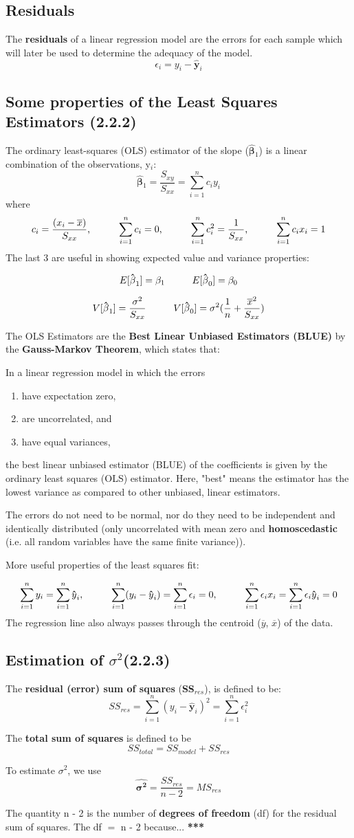 \documentclass{article}
\newcommand{\mt}[1]{\ensuremath{#1}}
\newcommand\ssc[2][\DefaultOpt]{%
  \def\DefaultOpt{#2}%
  \subsection[#1]{#2}%
}
\newcommand{\balist}{\begin{enumerate}[label=\alph*.]}
\newcommand{\elist}{\end{enumerate}}
\newcommand{\ep}{\mt{\epsilon} }         %
\newcommand{\bta}{\mt{\beta} }
\newcommand{\ms}{\mt{\operatorname{-}} }
\newcommand{\eql}{ \mt{\operatorname{=}} }
\newcommand{\uw}[2]{#1\mt{_{#2}}}
\newcommand{\eqn}[1]{\[#1\]}
\newcommand{\txt}[1]{\text{#1}} %
\newcommand{\mn}[1]{\mt{\overline{#1}}}
\newcommand{\ssq}{\mt{\sigma^2}}
\newcommand{\bh}[1]{\mathbf{\hat{\text{$#1$}}}}
\newcommand{\bth}{\mt{\bh{\beta}}}
\newcommand{\exv}[1]{E[#1]}
\newcommand{\vrn}[1]{V[#1]}
\newcommand\tab[1][1cm]{\hspace*{#1}}
\newcommand{\sumin}[1]{\mt{\sum_{i = 1}^n #1}}
\begin{document}
\ssc{Residuals}{

The \textbf{residuals} of a linear regression model are the errors for each sample which will later be used to determine the adequacy of the model.
\eqn{\uw{\ep}{i} = y_i - \bh{y}_i}

}
\ssc{Some properties of the Least Squares Estimators (2.2.2)}{

The ordinary least-squares (OLS) estimator of the
slope (\uw{\bth}{1}) is a linear combination of the observations,
\uw{y}{i}:
\eqn{\uw{\bth}{1} = \frac{\uw{S}{xy}}{\uw{S}{xx}} = \sum_{i = 1}^n c_i y_i}
where
\eqn{c_i = \frac{(x_i - \mn{x})}{S_{xx}}\txt{,\tab}\sum_{i = 1}^n c_i = 0\txt{,\tab}\sum_{i = 1}^n c_i^2 = \frac{1}{S_{xx}}\txt{,\tab}\sum_{i = 1}^n c_{i}x_{i} = 1}
The last 3 are useful in showing expected value and variance properties:

\eqn{\exv{\uw{\bth}{1}} = \uw{\bta}{1}\tab \exv{\uw{\bth}{0}} = \uw{\bta}{0}}

\eqn{\vrn{\uw{\bth}{1}} = \frac{\ssq}{\uw{S}{xx}}\tab \vrn{\uw{\bth}{0}} = \ssq(\frac{1}{n} + \frac{\mn{x}^2}{\uw{S}{xx}})}

The OLS Estimators are the \textbf{Best Linear Unbiased Estimators (BLUE)} by the \textbf{Gauss-Markov Theorem}, which states that:

In a linear regression model in which the errors 

\balist
\item have expectation zero,
\item are uncorrelated, and
\item have equal variances,
\elist 
the best linear unbiased estimator (BLUE) of the coefficients is given by the ordinary least squares (OLS) estimator. Here, "best" means the estimator has the lowest variance as compared to other unbiased, linear estimators.

The errors do not need to be normal, nor do they need to be
independent and identically distributed (only uncorrelated with
mean zero and \textbf{homoscedastic} (i.e. all random variables have the same finite variance)).

More useful properties of the least squares fit:

\eqn{\sum_{i = 1}^n y_i = \sum_{i = 1}^n \bh{y}_i,\tab \sum_{i = 1}^n (y_i - \bh{y}_i) = \sum_{i = 1}^n \ep_i = 0,\tab \sum_{i = 1}^n \ep_{i}x_i = \sum_{i = 1}^n \ep_{i}\bh{y}_i = 0}
The regression line also always passes through the centroid (\mn{y}, \mn{x}) of the data.
}

\ssc{Estimation of \ssq (2.2.3)}{

The \textbf{residual (error) sum of squares} (\textbf{\uw{SS}{res}}), is defined to be:
\eqn{\uw{SS}{res} = \sumin{(y_i - \bh{y}_i)^2} = \sumin{\ep^2_i}}

The \textbf{total sum of squares} is defined to be
\eqn{\uw{SS}{total} = \uw{SS}{model} + \uw{SS}{res}}

To estimate \ssq, we use
\eqn{\bh{\ssq} = \frac{\uw{SS}{res}}{n - 2} = \uw{MS}{res}}
}
The quantity n \ms 2 is the number of \textbf{degrees of freedom} (df) for the residual sum of squares. The df \eql n \ms 2 because... \textbf{***}
\end{document}
